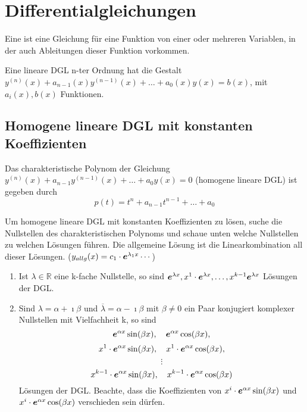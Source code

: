 \section{Differentialgleichungen}
	\begin{definition}
		Eine  ist eine Gleichung für eine Funktion von einer oder mehreren Variablen, in der auch Ableitungen dieser Funktion vorkommen.
	\end{definition}
		\begin{definition}
			Eine lineare DGL n-ter Ordnung hat die Gestalt $y^{(n)}(x) + a_{n-1}(x)y^{(n-1)}(x) + \dots + a_0(x) y(x) = b(x)$, mit $a_i(x), b(x)$ Funktionen. 
		\end{definition}
		\subsection{Homogene lineare DGL mit konstanten Koeffizienten}
			\begin{definition}
				Das charakteristische Polynom der Gleichung $y^{(n)}(x) + a_{n-1}y^{(n-1)}(x) + \dots + a_0y(x) = 0$ (homogene lineare DGL) ist gegeben durch
				$$ p(t) = t^n + a_{n-1} t^{n-1} + \dots + a_0 $$
			\end{definition}
			\begin{proofhelp}
				Um homogene lineare DGL mit konstanten Koeffizienten zu lösen, suche die Nullstellen des charakteristischen Polynoms und schaue unten welche Nullstellen zu welchen Lösungen führen. 
				Die allgemeine Lösung ist die Linearkombination all dieser Lösungen. ($y_{allg}(x) = c_1 \cdot \boldsymbol{e}^{\lambda_1 x} \cdots $)
				\begin{enumerate}
					\item Ist $\lambda \in \mathbb{R}$ eine k-fache Nullstelle, so sind $\boldsymbol{e}^{\lambda x}, x^1 \cdot \boldsymbol{e}^{\lambda x}, \dots, x^{k-1}\boldsymbol{e}^{\lambda x}$ Lösungen der DGL.
					\item Sind $\lambda = \alpha + \imath \beta$ und $\overline{\lambda} = \alpha - \imath \beta $ mit $\beta \neq 0$ ein Paar konjugiert komplexer Nullstellen mit Vielfachheit k, so sind 
					$$ \boldsymbol{e}^{\alpha x} \sin (\beta x), \quad \boldsymbol{e}^{\alpha x} \cos (\beta x), $$
					$$ x^1 \cdot \boldsymbol{e}^{\alpha x} \sin (\beta x), \quad x^1 \cdot \boldsymbol{e}^{\alpha x} \cos (\beta x), $$
					$$ \vdots $$
					$$ x^{k-1} \cdot \boldsymbol{e}^{\alpha x} \sin (\beta x), \quad x^{k-1} \cdot \boldsymbol{e}^{\alpha x} \cos (\beta x) $$
					Lösungen der DGL. Beachte, dass die Koeffizienten von $x^{i} \cdot \boldsymbol{e}^{\alpha x} \sin (\beta x)$ und $x^{i} \cdot \boldsymbol{e}^{\alpha x} \cos (\beta x)$ verschieden sein dürfen.
				\end{enumerate}
			\end{proofhelp}
